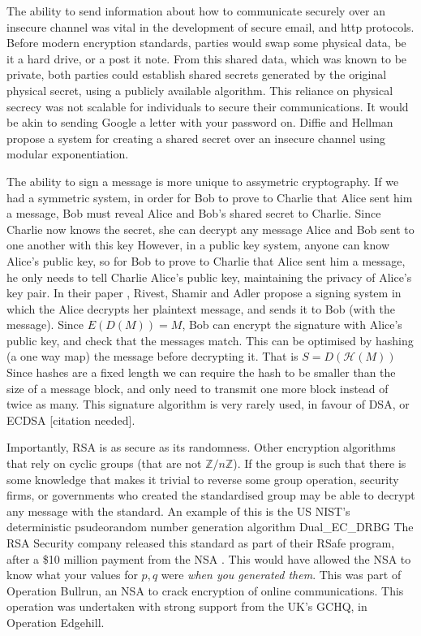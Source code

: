 \documentclass{article}
\begin{document}
The ability to send information about how to communicate securely over an insecure channel was vital in the development of secure email, and http protocols.
Before modern encryption standards, parties would swap some physical data, be it a hard drive, or a post it note.
From this shared data, which was known to be private,
both parties could establish shared secrets generated by the original physical secret,
using a publicly available algorithm.
This reliance on physical secrecy was not scalable for individuals to secure their communications.
It would be akin to sending Google a letter with your password on.
Diffie and Hellman \cite{Directions} propose a system for creating a shared secret over an insecure channel using modular exponentiation.

The ability to sign a message is more unique to assymetric cryptography.
If we had a symmetric system, in order for Bob to prove to Charlie that Alice sent him a message,
Bob must reveal Alice and Bob's shared secret to Charlie.
Since Charlie now knows the secret, she can decrypt any message Alice and Bob sent to one another with this key
However, in a public key system, anyone can know Alice's public key, so for Bob to prove to Charlie that Alice sent him a message,
he only needs to tell Charlie Alice's public key, maintaining the privacy of Alice's key pair.
In their paper \cite{RSA}, Rivest, Shamir and Adler propose a signing system
in which the Alice decrypts her plaintext message, and sends it to Bob (with the message).
Since $E(D(M)) = M$, Bob can encrypt the signature with Alice's public key, and check that the messages match.
This can be optimised by hashing (a one way map) the message before decrypting it. That is $S = D(\mathcal{H}(M))$
Since hashes are a fixed length we can require the hash to be smaller than the size of a message block,
and only need to transmit one more block instead of twice as many.
This signature algorithm is very rarely used, in favour of DSA, or ECDSA [citation needed].

Importantly, RSA is as secure as its randomness.
Other encryption algorithms that rely on cyclic groups (that are not $\mathbb{Z}/n\mathbb{Z}$).
If the group is such that there is some knowledge that makes it trivial to reverse some group operation,
security firms, or governments who created the standardised group may be able to decrypt any message with the standard.
An example of this is the US NIST's deterministic psudeorandom number generation algorithm Dual\_EC\_DRBG
The RSA Security company released this standard as part of their RSafe program, after a \$10 million payment from the NSA \cite{Reuters}.
This would have allowed the NSA to know what your values for $p, q$ were \emph{when you generated them}.
This was part of Operation Bullrun, an NSA to crack encryption of online communications.
This operation was undertaken with strong support from the UK's GCHQ, in Operation Edgehill.
\end{document}
